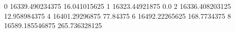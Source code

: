 0 16339.490234375 16.041015625
1 16323.44921875 0.0
2 16336.408203125 12.958984375
4 16401.29296875 77.84375
6 16492.22265625 168.7734375
8 16589.185546875 265.736328125
